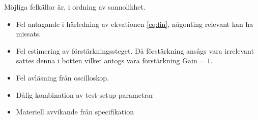 Möjliga felkällor är, i ordning av sannolikhet.
\begin{itemize}
	\item Fel antagande i härledning av ekvationen \cref{eq:fin}, någonting relevant kan ha missats. 
	\item Fel estimering av förstärkningssteget. Då förstärkning ansågs vara irrelevant sattes denna i botten vilket antogs vara förstärkning $\textrm{Gain} = 1$.
	\item Fel avläsning från oscilloskop.
	\item Dålig kombination av test-setup-parametrar
	\item Materiell avvikande från specifikation
\end{itemize}

